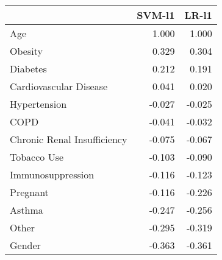 \begin{tabular}{lrr}
\toprule
{} &  SVM-l1 &  LR-l1 \\
\midrule
Age                         &   1.000 &  1.000 \\
Obesity                     &   0.329 &  0.304 \\
Diabetes                    &   0.212 &  0.191 \\
Cardiovascular Disease      &   0.041 &  0.020 \\
Hypertension                &  -0.027 & -0.025 \\
COPD                        &  -0.041 & -0.032 \\
Chronic Renal Insufficiency &  -0.075 & -0.067 \\
Tobacco Use                 &  -0.103 & -0.090 \\
Immunosuppression           &  -0.116 & -0.123 \\
Pregnant                    &  -0.116 & -0.226 \\
Asthma                      &  -0.247 & -0.256 \\
Other                       &  -0.295 & -0.319 \\
Gender                      &  -0.363 & -0.361 \\
\bottomrule
\end{tabular}
